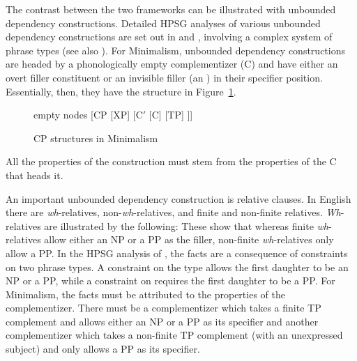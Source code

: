 \documentclass[output=paper
                ,modfonts
                ,nonflat
	        ,collection
	        ,collectionchapter
	        ,collectiontoclongg
 	        ,biblatex
                ,babelshorthands
                ,newtxmath
                ,draftmode
                ,colorlinks, citecolor=brown
]{./langsci/langscibook}
\begin{document}
The contrast between the two frameworks can be illustrated with unbounded dependency
constructions. Detailed HPSG analyses of various unbounded dependency constructions are set out in
\citet{Sag97a,Sag2010b} and \citet{GSag2000a-u}, involving a complex system of phrase types (see
also ). For
Minimalism, unbounded dependency constructions are headed by a phonologically empty complementizer
(C) and have either an overt filler constituent or an invisible filler (an ) in their
specifier position. Essentially, then, they have the structure in Figure~\ref{fig:min-CP}.
\begin{figure}
	\centering
	\begin{forest} %
		empty nodes
		[CP
		[XP]
		[C$'$ [C] [TP]
		]]
	\end{forest}
	\caption{\label{fig:min-CP}CP structures in Minimalism}
\end{figure}
All the properties of the construction must stem from the properties of the C that heads it. 

An important unbounded dependency construction is relative clauses. In English there are \emph{wh}-relatives, non-\emph{wh}-relatives, and finite and non-finite relatives. \emph{Wh}-relatives are illustrated by the following:
\eal
{}\label{ex:min-someone-who-can}
\label{ex:min-someone-on-whom-can}
\zl 
\eal
{}\label{ex:min-someone-who-to}
\label{ex:min-someone-whom-to}
\zl 
These show that whereas finite \emph{wh}-relatives allow either an NP or a PP as the filler,
non-finite \emph{wh}-relatives only allow a PP. In the HPSG analysis of \citet{Sag97a}, the facts
are a consequence of constraints on two phrase types. A constraint on the type
 allows the first daughter to be an
NP or a PP, while a constraint on 
requires the first daughter to be a PP. For Minimalism, the facts must be attributed to the
properties of the complementizer. There must be a complementizer which takes a finite TP complement
and allows either an NP or a PP as its specifier and another complementizer which takes a non-finite
TP complement (with an unexpressed subject) and only allows a PP as its specifier. 
\end{document}
